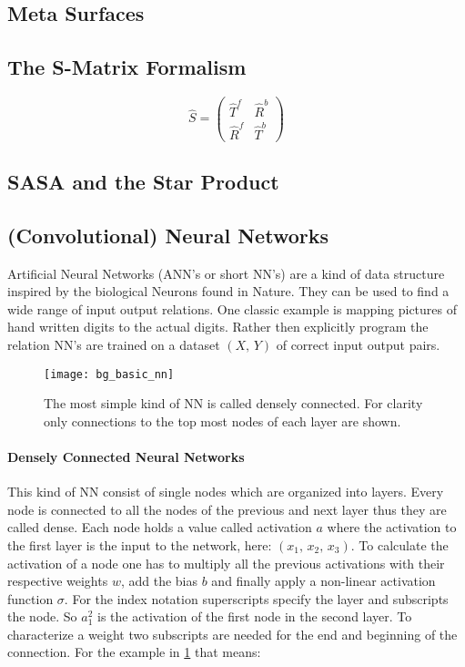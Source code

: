 \subsection{Meta Surfaces}

\subsection{The S-Matrix Formalism}

\begin{equation}
    \hat{S} =
    \begin{pmatrix}
        \hat{T}^f & \hat{R}^b \\
        \hat{R}^f & \hat{T}^b
    \end{pmatrix}
\end{equation}


\subsection{SASA and the Star Product}


\subsection{(Convolutional) Neural Networks}
Artificial Neural Networks (ANN's or short NN's) are a kind of data structure inspired by the biological Neurons found in Nature. They can be used to find a wide range of input output relations. One classic example is mapping pictures of hand written digits to the actual digits. Rather then explicitly program the relation NN's are trained on a dataset $(X, \, Y)$ of correct input output pairs.
\\


\begin{figure}[H]
    \centering
    \texttt{[image: bg\_basic\_nn]}
    \caption{The most simple kind of NN is called densely connected. For clarity only connections to the top most nodes of each layer are shown.}
    \label{fig:bg:basic_nn}
\end{figure}

\paragraph{Densely Connected Neural Networks}
This kind of NN consist of single nodes which are organized into layers. Every node is connected to all the nodes of the previous and next layer thus they are called dense. Each node holds a value called activation $a$ where the activation to the first layer is the input to the network, here:
$(x_1, \, x_2, \, x_3)$.
To calculate the activation of a node one has to multiply all the previous activations with their respective weights $w$, add the bias $b$ and finally apply a non-linear activation function $\sigma$. For the index notation superscripts specify the layer and subscripts the node. So $a^2_1$ is the activation of the first node in the second layer. To characterize a weight two subscripts are needed for the end and beginning of the connection. For the example in \ref{fig:bg:basic_nn} that means:

